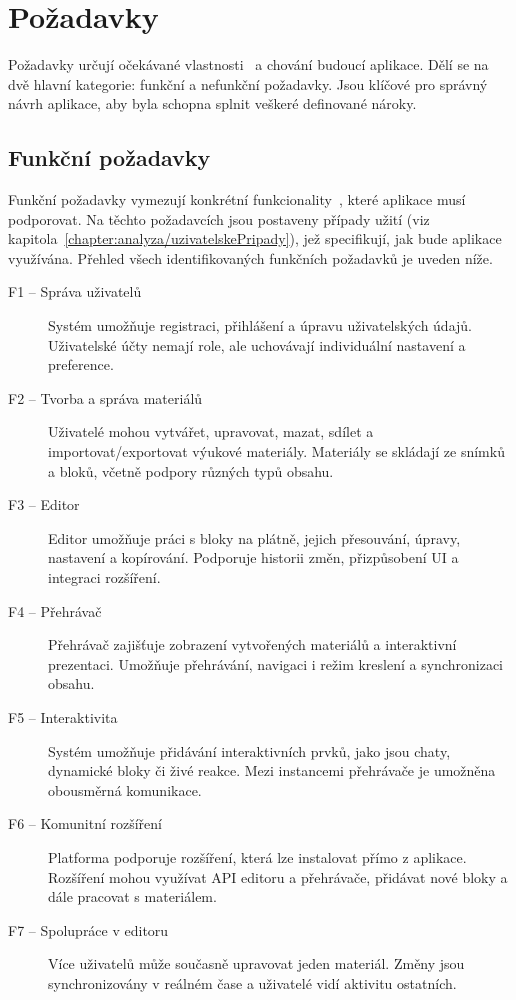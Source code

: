 \section{Požadavky}

Požadavky určují očekávané vlastnosti~\cite{uml_2007} a chování budoucí aplikace. Dělí se na dvě hlavní kategorie: funkční a nefunkční požadavky. Jsou klíčové pro správný návrh aplikace, aby byla schopna splnit veškeré definované nároky.

\subsection{Funkční požadavky}

Funkční požadavky vymezují konkrétní funkcionality~\cite{uml_2007}, které aplikace musí podporovat. Na těchto požadavcích jsou postaveny případy užití (viz kapitola~\ref{chapter:analyza/uzivatelskePripady}), jež specifikují, jak bude aplikace využívána. Přehled všech identifikovaných funkčních požadavků je uveden níže.


\begin{description}
    \item[F1 -- Správa uživatelů]
    Systém umožňuje registraci, přihlášení a úpravu uživatelských údajů. Uživatelské účty nemají role, ale uchovávají individuální nastavení a preference.

    \item[F2 -- Tvorba a správa materiálů]
    Uživatelé mohou vytvářet, upravovat, mazat, sdílet a importovat/exportovat výukové materiály. Materiály se skládají ze snímků a bloků, včetně podpory různých typů obsahu.

    \item[F3 -- Editor]
    Editor umožňuje práci s bloky na plátně, jejich přesouvání, úpravy, nastavení a kopírování. Podporuje historii změn, přizpůsobení UI a integraci rozšíření.

    \item[F4 -- Přehrávač]
    Přehrávač zajišťuje zobrazení vytvořených materiálů a interaktivní prezentaci. Umožňuje přehrávání, navigaci i režim kreslení a synchronizaci obsahu.

    \item[F5 -- Interaktivita]
    Systém umožňuje přidávání interaktivních prvků, jako jsou chaty, dynamické bloky či živé reakce. Mezi instancemi přehrávače je umožněna obousměrná komunikace.

    \item[F6 -- Komunitní rozšíření]
    Platforma podporuje rozšíření, která lze instalovat přímo z aplikace. Rozšíření mohou využívat API editoru a přehrávače, přidávat nové bloky a dále pracovat s materiálem.

    \item[F7 -- Spolupráce v editoru]
    Více uživatelů může současně upravovat jeden materiál. Změny jsou synchronizovány v reálném čase a uživatelé vidí aktivitu ostatních.
\end{description}




